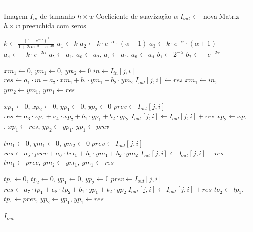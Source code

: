 \begin{sourcecode}[H]
    \caption{Algoritmo Deriche de suavização 2D.}
    \label{alg:deriche}
    \hrule
    \begin{algorithmic}[1]
        \REQUIRE Imagem $I_{in}$ de tamanho $h \times w$
        \REQUIRE Coeficiente de suavização $\alpha$
        \STATE $I_{out} \gets$ nova Matriz $h \times w$ preenchida com zeros

        \STATE $k \gets \frac{(1 - e^{-\alpha})^2}{1 + 2\alpha e^{-\alpha} - e^{-2\alpha}}$
        \STATE $a_1 \gets k$
        \STATE $a_2 \gets k \cdot e^{-\alpha} \cdot (\alpha - 1)$
        \STATE $a_3 \gets k \cdot e^{-\alpha} \cdot (\alpha + 1)$
        \STATE $a_4 \gets -k \cdot e^{-2\alpha}$
        \STATE $a_5 \gets a_1$, $a_6 \gets a_2$, $a_7 \gets a_3$, $a_8 \gets a_4$
        \STATE $b_1 \gets 2^{- \alpha}$
        \STATE $b_2 \gets -e^{-2\alpha}$

        \STATE $xm_1 \gets 0$, $ym_1 \gets 0$, $ym_2 \gets 0$
        \STATE $in \gets I_{in}[j, i]$
        \STATE $res \gets a_1 \cdot in + a_2 \cdot xm_1 + b_1 \cdot ym_1 + b_2 \cdot ym_2$
        \STATE $I_{out}[j, i] \gets res$
        \STATE $xm_1 \gets in$, $ym_2 \gets ym_1$, $ym_1 \gets res$
        \ENDFOR
        \ENDFOR

        \STATE $xp_1 \gets 0$, $xp_2 \gets 0$, $yp_1 \gets 0$, $yp_2 \gets 0$
        \STATE $prev \gets I_{out}[j, i]$
        \STATE $res \gets a_3 \cdot xp_1 + a_4 \cdot xp_2 + b_1 \cdot yp_1 + b_2 \cdot yp_2$
        \STATE $I_{out}[j, i] \gets I_{out}[j, i] + res$
        \STATE $xp_2 \gets xp_1$, $xp_1 \gets res$, $yp_2 \gets yp_1$, $yp_1 \gets prev$
        \ENDFOR
        \ENDFOR

        \STATE $tm_1 \gets 0$, $ym_1 \gets 0$, $ym_2 \gets 0$
        \STATE $prev \gets I_{out}[j, i]$
        \STATE $res \gets a_5 \cdot prev + a_6 \cdot tm_1 + b_1 \cdot ym_1 + b_2 \cdot ym_2$
        \STATE $I_{out}[j, i] \gets I_{out}[j, i] + res$
        \STATE $tm_1 \gets prev$, $ym_2 \gets ym_1$, $ym_1 \gets res$
        \ENDFOR
        \ENDFOR

        \STATE $tp_1 \gets 0$, $tp_2 \gets 0$, $yp_1 \gets 0$, $yp_2 \gets 0$
        \STATE $prev \gets I_{out}[j, i]$
        \STATE $res \gets a_7 \cdot tp_1 + a_8 \cdot tp_2 + b_1 \cdot yp_1 + b_2 \cdot yp_2$
        \STATE $I_{out}[j, i] \gets I_{out}[j, i] + res$
        \STATE $tp_2 \gets tp_1$, $tp_1 \gets prev$, $yp_2 \gets yp_1$, $yp_1 \gets res$
        \ENDFOR
        \ENDFOR

        \RETURN $I_{out}$
    \end{algorithmic}
    \hrule
\end{sourcecode}

